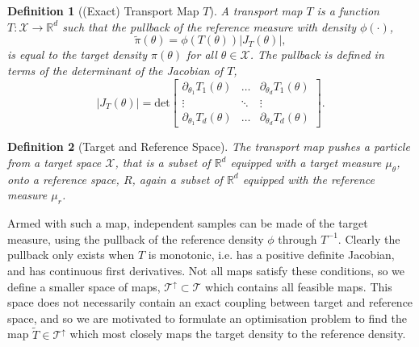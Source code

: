\documentclass[final]{siamltex}
\newtheorem{dfn}{Definition}[section]
\begin{document}
\begin{dfn}[(Exact) Transport Map $T$]
	A transport map $T$ is a function $T\colon
        \mathcal{X}\rightarrow\mathbb{R}^d$ such that the {\it
          pullback} of the reference measure with density $\phi(\cdot)$,
	\begin{equation}\label{eq:pullback}
		\tilde{\pi}(\theta) = \phi(T(\theta))|J_T(\theta)|,
	\end{equation}
	is equal to the target density $\pi(\theta)$ for all $\theta \in \mathcal{X}$. The pullback is defined in terms of the determinant of the Jacobian of $T$,
	\[
		|J_T(\theta)| = \text{det}\begin{bmatrix} \partial_{\theta_1} T_1(\theta) & \dots & \partial_{\theta_d} T_1(\theta) \\ \vdots & \ddots & \vdots \\ \partial_{\theta_1} T_d(\theta) & \dots & \partial_{\theta_d} T_d(\theta) \end{bmatrix}.
	\]
\end{dfn}


\begin{dfn}[Target and Reference Space]
	The transport map pushes a particle from a {\it target space} $\mathcal{X}$, that is a subset of $\mathbb{R}^d$ equipped with a target measure $\mu_{\theta}$, onto a {\it reference space}, $R$, again a subset of $\mathbb{R}^d$ equipped with the reference measure $\mu_r$.
\end{dfn}

Armed with such a map, independent samples can be made of the target
measure, using the pullback of the reference density $\phi$ through $T^{-1}$.
Clearly the pullback only exists when $T$ is monotonic, i.e. has a positive definite Jacobian, and has continuous first derivatives.
Not all maps satisfy these conditions, so we define a smaller space of
maps, $\mathcal{T}^\uparrow \subset \mathcal{T}$ which contains all
feasible maps. This space does not necessarily contain an exact
coupling between target and reference space, and so we are motivated to formulate an optimisation problem to find the map $\tilde{T}
\in \mathcal{T}^\uparrow$ which most closely maps the target density
to the reference density.
\end{document}

